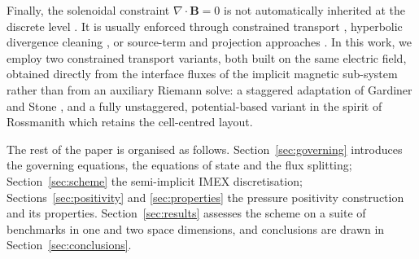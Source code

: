 \documentclass[a4paper,fleqn]{cas-sc}
\theoremstyle{definition}
\theoremstyle{remark}
\begin{document}
Finally, the solenoidal constraint $\nabla\!\cdot\mathbf{B}=0$ is not automatically
inherited at the discrete level \cite{Toth2000}. It is usually enforced through
constrained transport \cite{EvansHawley1988,GardinerStone2005,BalsaraSpicer1999,Rossmanith2006},
hyperbolic divergence cleaning \cite{Dedner2002}, or source-term and projection
approaches \cite{Powell1999,BrackbillBarnes1980}. In this work, we employ two constrained transport
variants, both built on the same electric field, obtained directly from the interface
fluxes of the implicit magnetic sub-system rather than from an auxiliary Riemann solve:
a staggered adaptation of Gardiner and Stone \cite{GardinerStone2005}, and a fully
unstaggered, potential-based variant in the spirit of Rossmanith \cite{Rossmanith2006}
which retains the cell-centred layout. 


The rest of the paper is organised as follows.
Section~\ref{sec:governing} introduces the governing equations, the equations of state
and the flux splitting; Section~\ref{sec:scheme} the semi-implicit IMEX discretisation;
Sections~\ref{sec:positivity} and \ref{sec:properties} the pressure positivity construction and
its properties. Section~\ref{sec:results} assesses the scheme on a suite of benchmarks
in one and two space dimensions, and conclusions are drawn in
Section~\ref{sec:conclusions}.
\end{document}
